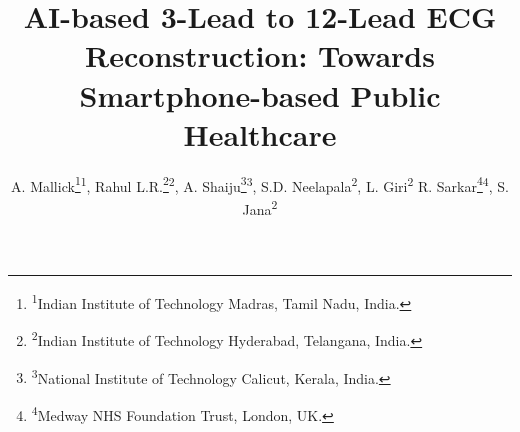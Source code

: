 \documentclass[conference]{IEEEtran}
\begin{document}
\title{AI-based 3-Lead to 12-Lead ECG Reconstruction: Towards Smartphone-based Public Healthcare
}


\author{
  A. Mallick\thanks{\textsuperscript{1}Indian Institute of Technology Madras, Tamil Nadu, India.}\textsuperscript{1},
  Rahul L.R.\thanks{\textsuperscript{2}Indian Institute of Technology Hyderabad, Telangana, India.}\textsuperscript{2},
  A. Shaiju\thanks{\textsuperscript{3}National Institute of Technology Calicut, Kerala, India.}\textsuperscript{3},
  S.D. Neelapala\textsuperscript{2},
  L. Giri\textsuperscript{2}
  R. Sarkar\thanks{\textsuperscript{4}Medway NHS Foundation Trust, London, UK.}\textsuperscript{4},
  S. Jana\textsuperscript{2}
}

\maketitle
\end{document}
